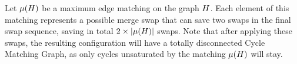 \documentclass[msc,english,table,xcdraw]{ppgccufmg}
\begin{document}
Let $\mu(H)$ be a maximum edge matching on the graph 
$H$.
Each element of this matching represents a possible merge swap that can save two 
swaps in the final swap sequence, saving in total $2\times|\mu(H)|$ swaps.
Note that after applying these swaps, the resulting configuration will have a
totally disconnected Cycle Matching Graph, as only cycles unsaturated by the 
matching $\mu(H)$ will stay.





\end{document}

